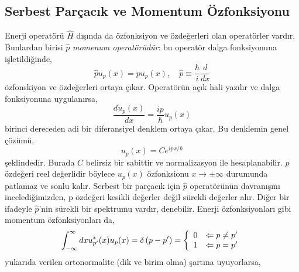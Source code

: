 \documentclass[a4paper,12pt, twoside]{article}
\begin{document}
\subsection{Serbest Parçacık ve Momentum Özfonksiyonu}

Enerji operatörü $\hat H$ dışında da özfonksiyon ve özdeğerleri olan operatörler vardır. Bunlardan birisi $\hat p$ \emph{momenum operatörüdür}: bu operatör dalga fonksiyonuna işletildiğinde,
\begin{equation}
\hat p u _ { p } ( x ) = p u _ { p } ( x ), \quad \hat p \equiv \frac{\hbar}{i} \frac{d}{dx}
\end{equation}
özfonskiyon ve özdeğerleri ortaya çıkar. Operatörün açık hali yazılır ve dalga fonksiyonuna uygulanırsa,
\begin{equation}
\frac { d u _ { p } ( x ) } { d x } = \frac { i p } { \hbar } u _ { p } ( x )
\end{equation}
birinci dereceden adi bir diferansiyel denklem ortaya çıkar. Bu denklemin genel çözümü,
\begin{equation}
u _ { p } ( x ) = C e ^ { i p x / \hbar }
\end{equation}
şeklindedir. Burada $C$ belirsiz bir sabittir ve normalizasyon ile hesaplanabilir. $p$ özdeğeri reel değerlidir böylece $u_p(x)$ özfonksionu $x \rightarrow \pm \infty$ durumunda patlamaz ve sonlu kalır. Serbest bir parçacık için $\hat p$ operatörünün davranışını incelediğimizden, p özdeğeri kesikli değerler değil sürekli değerler alır. Diğer bir ifadeyle $\hat p$'nin sürekli bir spektrumu vardır, denebilir. Enerji özfonksiyonları gibi momentum özfonksiyonları da,
\begin{equation}
\int _ { - \infty } ^ { \infty } d x u _ { p ^ { \prime } } ^ { * } ( x ) u _ { p } ( x ) = \delta \left( p - p ^ { \prime } \right)
 = \left\{
\begin{array} { c l } 
{ 0 } & { \Leftarrow p \neq p^\prime } \\ 
{ 1 } & { \Leftarrow p   =  p^\prime} 
\end{array} 
\right.
\end{equation}
yukarıda verilen ortonormalite (dik ve birim olma) şartına uyuyorlarsa,
\end{document}
